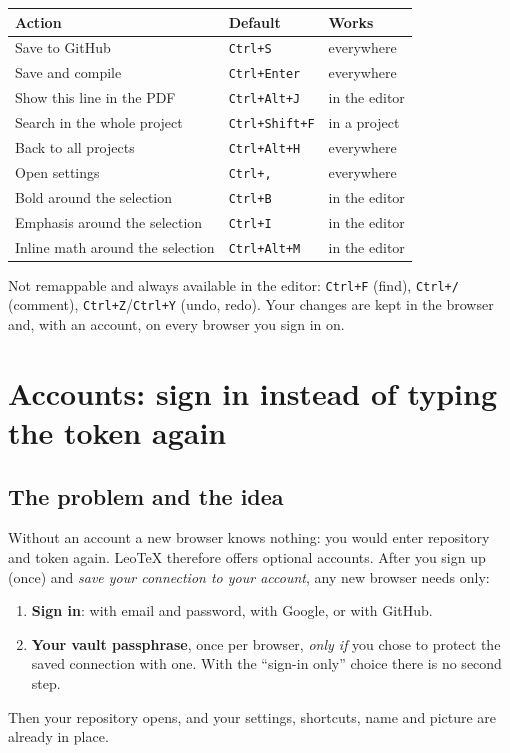 \documentclass[11pt,a4paper]{article}
\newcommand{\leotex}{Leo\TeX{}}
\newcommand{\key}[1]{\texttt{\small #1}}
\begin{document}
\begin{center}
\begin{tabular}{@{}lll@{}}
\toprule
\textbf{Action} & \textbf{Default} & \textbf{Works}\\\midrule
Save to GitHub & \key{Ctrl+S} & everywhere\\
Save and compile & \key{Ctrl+Enter} & everywhere\\
Show this line in the PDF & \key{Ctrl+Alt+J} & in the editor\\
Search in the whole project & \key{Ctrl+Shift+F} & in a project\\
Back to all projects & \key{Ctrl+Alt+H} & everywhere\\
Open settings & \key{Ctrl+,} & everywhere\\
Bold around the selection & \key{Ctrl+B} & in the editor\\
Emphasis around the selection & \key{Ctrl+I} & in the editor\\
Inline math around the selection & \key{Ctrl+Alt+M} & in the editor\\
\bottomrule
\end{tabular}
\end{center}
Not remappable and always available in the editor: \key{Ctrl+F} (find), \key{Ctrl+/} (comment), \key{Ctrl+Z}/\key{Ctrl+Y} (undo, redo).
Your changes are kept in the browser and, with an account, on every browser you sign in on.

\section{Accounts: sign in instead of typing the token again}
\label{sec:accounts}

\subsection{The problem and the idea}
Without an account a new browser knows nothing: you would enter repository and token again. \leotex{} therefore offers optional accounts. After you
sign up (once) and \emph{save your connection to your account}, any new browser needs only:
\begin{enumerate}
  \item \textbf{Sign in}: with email and password, with Google, or with GitHub.
  \item \textbf{Your vault passphrase}, once per browser, \emph{only if} you chose to protect the saved connection with one. With the ``sign-in only'' choice there is no second step.
\end{enumerate}
Then your repository opens, and your settings, shortcuts, name and picture are already in place.
\end{document}
